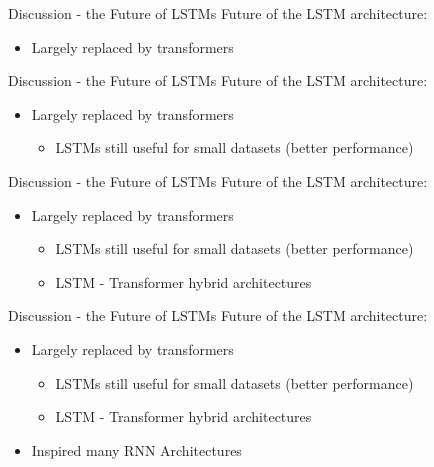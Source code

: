 \documentclass[10pt, aspectratio=169]{beamer}
\begin{document}
\begin{frame}[t]{Discussion - the Future of LSTMs}
Future of the LSTM architecture:
\begin{itemize}
    \item Largely replaced by transformers
\end{itemize}
\end{frame}


\begin{frame}[t]{Discussion - the Future of LSTMs}
Future of the LSTM architecture:
\begin{itemize}
    \item Largely replaced by transformers
    \begin{itemize}
        \item LSTMs still useful for small datasets (better performance)
    \end{itemize} 
\end{itemize}
\end{frame}

\begin{frame}[t]{Discussion - the Future of LSTMs}
Future of the LSTM architecture:
\begin{itemize}
    \item Largely replaced by transformers
    \begin{itemize}
        \item LSTMs still useful for small datasets (better performance)
        \item LSTM - Transformer hybrid architectures 
    \end{itemize} 
\end{itemize}
\end{frame}

\begin{frame}[t]{Discussion - the Future of LSTMs}
Future of the LSTM architecture:
\begin{itemize}
    \item Largely replaced by transformers
    \begin{itemize}
        \item LSTMs still useful for small datasets (better performance)
        \item LSTM - Transformer hybrid architectures 
    \end{itemize} 
    \item Inspired many RNN Architectures
\end{itemize}
\end{frame}
\end{document}

